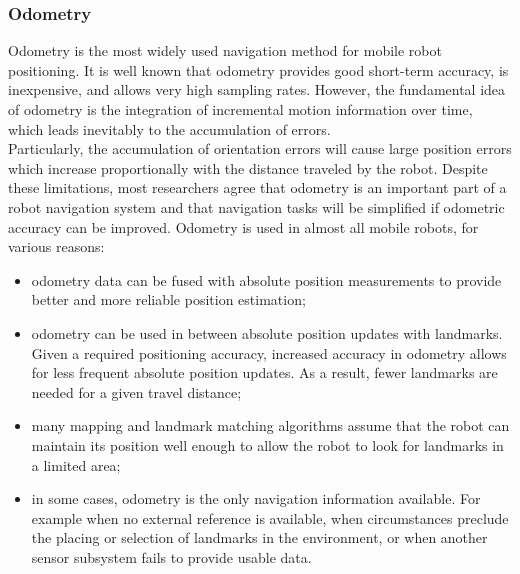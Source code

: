 \subsubsection{Odometry}
\label{sec:mobile:odometry}

Odometry is the most widely used navigation method for mobile robot
positioning. It is well known that odometry provides good short-term
accuracy, is inexpensive, and allows very high sampling rates. However,
the fundamental idea of odometry is the integration of incremental motion
information over time, which leads inevitably to the accumulation of errors.
\\
Particularly, the accumulation of orientation errors will cause large
position errors which increase proportionally with the distance traveled
by the robot. Despite these limitations, most researchers agree that odometry
is an important part of a robot navigation system and that navigation tasks
will be simplified if odometric accuracy can be improved. Odometry is used
in almost all mobile robots, for various reasons:

\begin{itemize}
\item odometry data can be fused with absolute
  position measurements to provide better and more
  reliable position estimation;
\item odometry can be used in between absolute position updates with
  landmarks. Given a required positioning accuracy, increased accuracy
  in odometry allows for less frequent absolute position updates. As
  a result, fewer landmarks are needed for a given travel distance;
\item many mapping and landmark matching algorithms assume that the robot
  can maintain its position well enough to allow the robot to look for
  landmarks in a limited area;
\item in some cases, odometry is the only navigation information available.
  For example when no external reference is available, when circumstances
  preclude the placing or selection of landmarks in the environment,
  or when another sensor subsystem fails to provide usable data.
\end{itemize}

